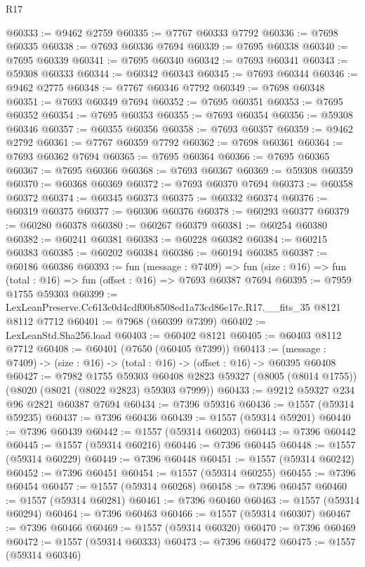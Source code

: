 \begin{lexlean}{R17}
\begin{coremodule}
@60333 := @9462 @2759
@60335 := @7767 @60333 @7792
@60336 := @7698 @60335
@60338 := @7693 @60336 @7694
@60339 := @7695 @60338
@60340 := @7695 @60339
@60341 := @7695 @60340
@60342 := @7693 @60341
@60343 := @59308 @60333
@60344 := @60342 @60343
@60345 := @7693 @60344
@60346 := @9462 @2775
@60348 := @7767 @60346 @7792
@60349 := @7698 @60348
@60351 := @7693 @60349 @7694
@60352 := @7695 @60351
@60353 := @7695 @60352
@60354 := @7695 @60353
@60355 := @7693 @60354
@60356 := @59308 @60346
@60357 := @60355 @60356
@60358 := @7693 @60357
@60359 := @9462 @2792
@60361 := @7767 @60359 @7792
@60362 := @7698 @60361
@60364 := @7693 @60362 @7694
@60365 := @7695 @60364
@60366 := @7695 @60365
@60367 := @7695 @60366
@60368 := @7693 @60367
@60369 := @59308 @60359
@60370 := @60368 @60369
@60372 := @7693 @60370 @7694
@60373 := @60358 @60372
@60374 := @60345 @60373
@60375 := @60332 @60374
@60376 := @60319 @60375
@60377 := @60306 @60376
@60378 := @60293 @60377
@60379 := @60280 @60378
@60380 := @60267 @60379
@60381 := @60254 @60380
@60382 := @60241 @60381
@60383 := @60228 @60382
@60384 := @60215 @60383
@60385 := @60202 @60384
@60386 := @60194 @60385
@60387 := @60186 @60386
@60393 := fun (message : @7409) =>
  fun (size : @16) => fun (total : @16) => fun (offset : @16) => @7693 @60387 @7694
@60395 := @7959 @1755 @59303
@60399 := LexLeanPreserve.Cc613c0d4cdf00b8508ed1a73cd86e17c.R17.__fits_35 @8121 @8112 @7712
@60401 := @7968 (@60399 @7399)
@60402 := LexLeanStd.Sha256.load
@60403 := @60402 @8121
@60405 := @60403 @8112 @7712
@60408 := @60401 (@7650 (@60405 @7399))
@60413 := (message : @7409) -> (size : @16) -> (total : @16) -> (offset : @16) -> @60395 @60408
@60427 := @7982
    @1755
    @59303
    @60408
    @2823
    @59327
    (@8005 (@8014 @1755))
    (@8020 (@8021 (@8022 @2823) @59303 @7999))
@60433 := @9212 @59327 @234 @96 @2821 @60387 @7694
@60434 := @7396 @59316
@60436 := @1557 (@59314 @59235)
@60437 := @7396 @60436
@60439 := @1557 (@59314 @59201)
@60440 := @7396 @60439
@60442 := @1557 (@59314 @60203)
@60443 := @7396 @60442
@60445 := @1557 (@59314 @60216)
@60446 := @7396 @60445
@60448 := @1557 (@59314 @60229)
@60449 := @7396 @60448
@60451 := @1557 (@59314 @60242)
@60452 := @7396 @60451
@60454 := @1557 (@59314 @60255)
@60455 := @7396 @60454
@60457 := @1557 (@59314 @60268)
@60458 := @7396 @60457
@60460 := @1557 (@59314 @60281)
@60461 := @7396 @60460
@60463 := @1557 (@59314 @60294)
@60464 := @7396 @60463
@60466 := @1557 (@59314 @60307)
@60467 := @7396 @60466
@60469 := @1557 (@59314 @60320)
@60470 := @7396 @60469
@60472 := @1557 (@59314 @60333)
@60473 := @7396 @60472
@60475 := @1557 (@59314 @60346)

\end{coremodule}
\end{lexlean}
